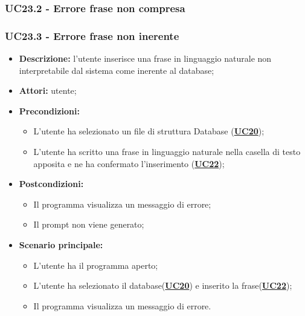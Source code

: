 \documentclass[5pt]{article}
\begin{document}
\subsubsection{UC23.2 - Errore frase non compresa}
\label{sec:UC23.2}

\subsubsection{UC23.3 - Errore frase non inerente}
\label{sec:UC23.3}
\begin{itemize}
	\item \textbf{Descrizione:} l’utente inserisce una frase in linguaggio naturale non interpretabile dal sistema come inerente al database;
	\item \textbf{Attori:} utente;
	\item \textbf{Precondizioni:} 
	\begin{itemize}
		\item L’utente ha selezionato un file di struttura Database (\hyperref[sec:UC20]{\textbf{UC20}});
		\item L’utente ha scritto una frase in linguaggio naturale nella casella di testo apposita e ne ha confermato l’inserimento (\hyperref[sec:UC22]{\textbf{UC22}});
	\end{itemize}
	\item \textbf{Postcondizioni:} 
	\begin{itemize}
		\item Il programma visualizza un messaggio di errore;
		\item Il prompt non viene generato;
	\end{itemize}
	\item \textbf{Scenario principale:} 
	\begin{itemize}
		\item L’utente ha il programma aperto;
		\item L’utente ha selezionato il database(\hyperref[sec:UC20]{\textbf{UC20}}) e inserito la frase(\hyperref[sec:UC22]{\textbf{UC22}});
		\item Il programma visualizza un messaggio di errore.
	\end{itemize}
\end{itemize}
\end{document}
